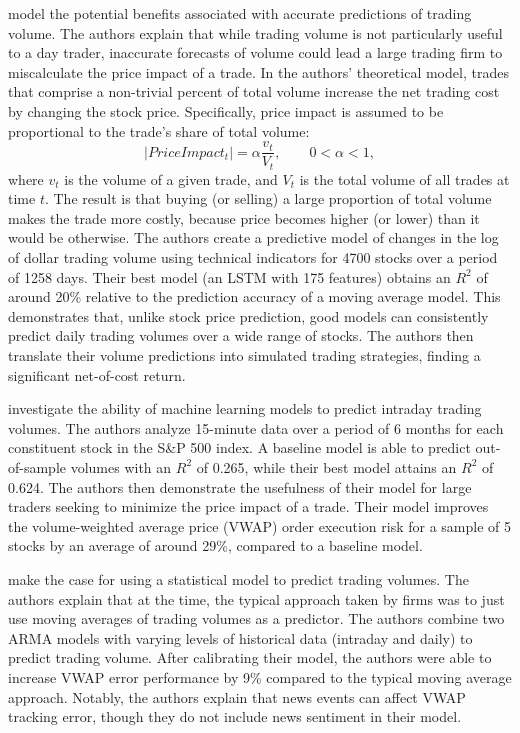 \documentclass[12pt]{article}
\begin{document}
\textcite{goyenko2024trading} model the potential benefits associated with accurate predictions of trading volume. The authors explain that while trading volume is not particularly useful to a day trader, inaccurate forecasts of volume could lead a large trading firm to miscalculate the price impact of a trade. In the authors' theoretical model, trades that comprise a non-trivial percent of total volume increase the net trading cost by changing the stock price. Specifically, price impact is assumed to be proportional to the trade's share of total volume:
\begin{equation}
    |Price Impact_{t}| = \alpha\frac{v_{t}}{V_{t}}, \qquad 0< \alpha < 1,
\end{equation}
where $v_{t}$ is the volume of a given trade, and $V_{t}$ is the total volume of all trades at time $t$. The result is that buying (or selling) a large proportion of total volume makes the trade more costly, because price becomes higher (or lower) than it would be otherwise. The authors create a predictive model of changes in the log of dollar trading volume using technical indicators for 4700 stocks over a period of 1258 days. Their best model (an LSTM with 175 features) obtains an $R^2$ of around 20\% relative to the prediction accuracy of a moving average model. This demonstrates that, unlike stock price prediction, good models can consistently predict daily trading volumes over a wide range of stocks. The authors then translate their volume predictions into simulated trading strategies, finding a significant net-of-cost return.

\textcite{cucuringu2025forecasting} investigate the ability of machine learning models to predict intraday trading volumes. The authors analyze 15-minute data over a period of 6 months for each constituent stock in the S\&P 500 index. A baseline model is able to predict out-of-sample volumes with an $R^2$ of 0.265, while their best model attains an $R^2$ of 0.624. The authors then demonstrate the usefulness of their model for large traders seeking to minimize the price impact of a trade. Their model improves the volume-weighted average price (VWAP) order execution risk for a sample of 5 stocks by an average of around 29\%, compared to a baseline model.

\textcite{satish2014predicting} make the case for using a statistical model to predict trading volumes. The authors explain that at the time,  the typical approach taken by firms was to just use moving averages of trading volumes as a predictor. The authors combine two ARMA models with varying levels of historical data (intraday and daily) to predict trading volume. After calibrating their model, the authors were able to increase VWAP error performance by 9\% compared to the typical moving average approach. Notably, the authors explain that news events can affect VWAP tracking error, though they do not include news sentiment in their model.
\end{document}
